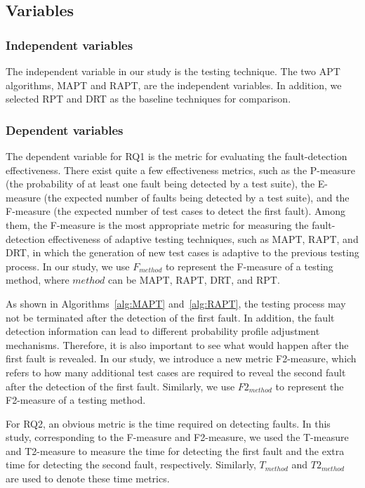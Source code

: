 \documentclass[10pt,journal,compsoc]{IEEEtran}
\begin{document}


\subsection{Variables}

\subsubsection{Independent variables}
The independent variable in our study is the testing technique. The two APT algorithms, MAPT and RAPT, are the independent variables. In addition, we selected RPT and DRT as the baseline techniques for comparison.

\subsubsection{Dependent variables}
The dependent variable for RQ1 is the metric for evaluating the fault-detection effectiveness. There exist quite a few effectiveness metrics, such as the P-measure (the probability of at least one fault being detected by a test suite), the E-measure (the expected number of faults being detected by a test suite), and the F-measure (the expected number of test cases to detect the first fault). Among them, the F-measure is the most appropriate metric for measuring the fault-detection effectiveness of adaptive testing techniques, such as MAPT, RAPT, and DRT, in which the generation of new test cases is adaptive to the previous testing process. In our study, we use $F_{method}$ to represent the F-measure of a testing method, where $method$ can be MAPT, RAPT, DRT, and RPT.

As shown in Algorithms~\ref{alg:MAPT} and~\ref{alg:RAPT}, the testing process may not be terminated after the detection of the first fault. In addition, the fault detection information can lead to different probability profile adjustment mechanisms. Therefore, it is also important to see what would happen after the first fault is revealed. In our study, we introduce a new metric F2-measure, which refers to how many additional test cases are required to reveal the second fault after the detection of the first fault. Similarly, we use $F2_{method}$ to represent the F2-measure of a testing method.

For RQ2, an obvious metric is the time required on detecting faults. In this study, corresponding to the F-measure and F2-measure, we used the T-measure and T2-measure to measure the time for detecting the first fault and the extra time for detecting the second fault, respectively. Similarly, $T_{method}$ and $T2_{method}$ are used to denote these time metrics.
\end{document}
